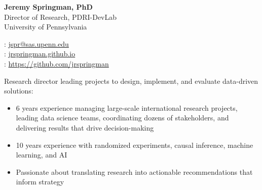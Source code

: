 \documentclass[11pt]{article}
\renewcommand{\today}{\monthname[\the\month] \the\year}
\begin{document}
\thispagestyle{empty}



\begin{multicols}{2}
{\Large {\bf Jeremy Springman, PhD}}\\
Director of Research, PDRI-DevLab\\
University of Pennsylvania\\

\columnbreak
\begin{flushright}

\faEnvelope: \href{mailto:jspr@sas.upenn.edu}{jspr@sas.upenn.edu}\\
\faLaptop: \url{jrspringman.github.io}\\
\faGithub: \url{https://github.com/jrspringman}\\
\end{flushright}
\end{multicols}
\vspace{-10pt}

Research director leading projects to design, implement, and evaluate data-driven solutions:
\begin{itemize}[itemsep=0mm, parsep=0pt]
\item 6 years experience managing large-scale international research projects, leading data science teams, coordinating dozens of stakeholders, and delivering results that drive decision-making
\item 10 years experience with randomized experiments, causal inference, machine learning, and AI 
\item Passionate about translating research into actionable recommendations that inform strategy
\end{itemize}
\end{document}
